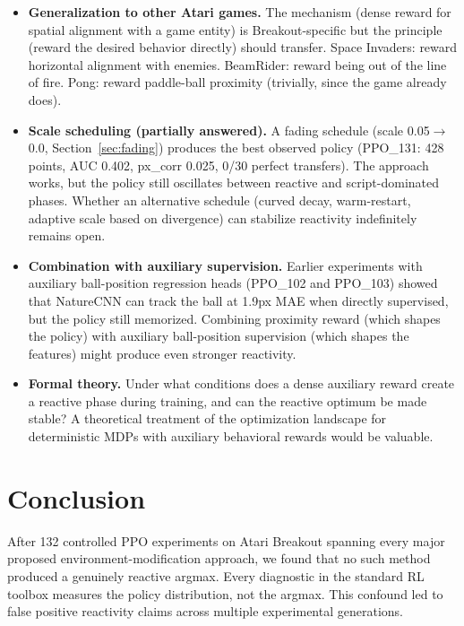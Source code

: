 \documentclass[11pt]{article}
\begin{document}
\begin{itemize}
    \item \textbf{Generalization to other Atari games.} The mechanism
    (dense reward for spatial alignment with a game entity) is Breakout-specific
    but the principle (reward the desired behavior directly) should transfer.
    Space Invaders: reward horizontal alignment with enemies. BeamRider: reward
    being out of the line of fire. Pong: reward paddle-ball proximity (trivially,
    since the game already does).
    \item \textbf{Scale scheduling (partially answered).} A fading schedule
    (scale 0.05$\to$0.0, Section~\ref{sec:fading}) produces the best observed
    policy (PPO\_131: 428 points, AUC 0.402, px\_corr 0.025, 0/30 perfect
    transfers). The approach works, but the policy still oscillates between
    reactive and script-dominated phases. Whether an alternative schedule
    (curved decay, warm-restart, adaptive scale based on divergence) can
    stabilize reactivity indefinitely remains open.
    \item \textbf{Combination with auxiliary supervision.} Earlier experiments
    with auxiliary ball-position regression heads (PPO\_102 and PPO\_103)
    showed that NatureCNN can track the ball at 1.9px MAE when directly
    supervised, but the policy still memorized. Combining proximity reward
    (which shapes the policy) with auxiliary ball-position
    supervision (which shapes the features) might produce even stronger
    reactivity.
    \item \textbf{Formal theory.} Under what conditions does a dense auxiliary
    reward create a reactive phase during training, and can the reactive
    optimum be made stable? A theoretical treatment of the optimization
    landscape for deterministic MDPs with auxiliary behavioral rewards would
    be valuable.
\end{itemize}

\section{Conclusion}

After 132 controlled PPO experiments on Atari Breakout spanning every major
proposed environment-modification approach, we found that no such method
produced a genuinely reactive argmax. Every diagnostic in the standard
RL toolbox measures the policy distribution, not the argmax. This confound
led to false positive reactivity claims across multiple experimental
generations.
\end{document}
